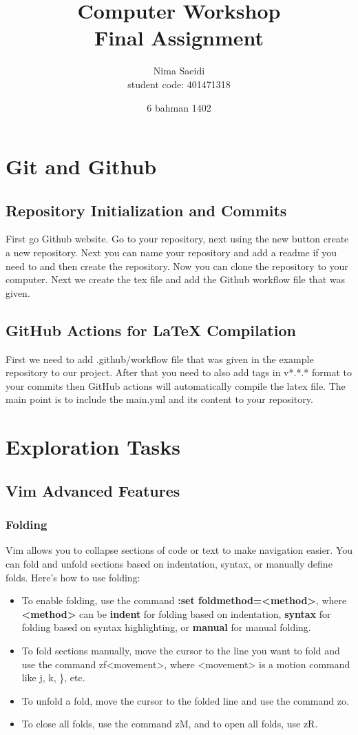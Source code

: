 \documentclass[titlepage]{article}
\title{\textbf{Computer Workshop\\ Final Assignment}}
\author{Nima Saeidi \\ student code: 401471318}
\date{6 bahman 1402}
\begin{document}
\maketitle
\tableofcontents

\newpage



\section{Git and Github}
\subsection{Repository Initialization and Commits}
First go Github website. Go to your repository, next using the new button create a new repository. Next you can name your repository and add a readme if you need to and then create the repository. Now you can clone the repository to your computer. Next we create the tex file and add the Github workflow file that was given.

\subsection{GitHub Actions for LaTeX Compilation}
First we need to add .github/workflow file that was given in the example repository to our project. After that you need to also add tags in v*.*.* format to your commits then GitHub actions will automatically compile the latex file. The main point is to include the main.yml and its content to your repository.


\section{Exploration Tasks}
\subsection{Vim Advanced Features}
\subsubsection{Folding}
Vim allows you to collapse sections of code or text to make navigation easier. You can fold and unfold sections based on indentation, syntax, or manually define folds. Here's how to use folding:

\begin{itemize}
\item To enable folding, use the command \textbf{:set foldmethod=<method>}, where \textbf{<method>} can be \textbf{indent} for folding based on indentation, \textbf{syntax} for folding based on syntax highlighting, or \textbf{manual} for manual folding.
\item To fold sections manually, move the cursor to the line you want to fold and use the command zf<movement>, where <movement> is a motion command like j, k, \}, etc.
\item To unfold a fold, move the cursor to the folded line and use the command zo.
\item To close all folds, use the command zM, and to open all folds, use zR.
\end{itemize}
\end{document}
